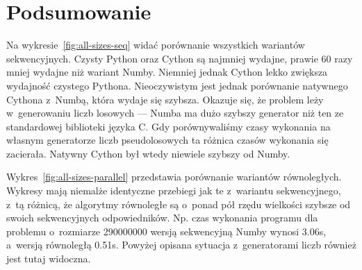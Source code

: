 \begin{figure*}
    \centering
    
    \caption{Czas wykonania algorytmu w zależności od rozmiaru problemu}
    \label{fig:all-sizes-seq}
\end{figure*}


\begin{figure*}
    \centering
    
    \caption{Czas wykonania algorytmu w zależności od rozmiaru problemu}
    \label{fig:all-sizes-parallel}
\end{figure*}

\begin{figure*}
    \centering
    \begin{minipage}[b]{.45\textwidth}
        \centering
        
        \caption{Czas wykonania algorytmu w zależności od liczby wątków}
        \label{fig:all-threads}
    \end{minipage}
    \hfill
    \begin{minipage}[b]{.45\textwidth}
        \centering
        
        \caption{Przyspieszenie liczenia liczby $\pi$}
        \label{fig:all-speedup}
    \end{minipage}
\end{figure*}


\section{Podsumowanie}

Na wykresie~\ref{fig:all-sizes-seq} widać porównanie
wszystkich wariantów sekwencyjnych.
Czysty Python oraz Cython są najmniej wydajne,
prawie 60 razy mniej wydajne niż wariant Numby.
Niemniej jednak Cython lekko zwiększa wydajność czystego Pythona.
Nieoczywistym jest jednak porównanie natywnego Cythona z~Numbą,
która wydaje się szybsza.
Okazuje się, że problem leży w~generowaniu liczb losowych ---
Numba ma dużo szybszy generator niż ten ze standardowej biblioteki
języka C\@.
Gdy porównywaliśmy czasy wykonania na własnym generatorze liczb pseudolosowych
ta różnica czasów wykonania się zacierała.
Natywny Cython był wtedy niewiele szybszy od Numby.

Wykres~\ref{fig:all-sizes-parallel} przedstawia porównanie wariantów równoległych.
Wykresy mają niemalże identyczne przebiegi jak te z~wariantu sekwencyjnego,
z~tą różnicą, że algorytmy równoległe są o~ponad pół rzędu wielkości szybsze
od swoich sekwencyjnych odpowiedników.
Np. czas wykonania programu
dla problemu o~rozmiarze 290000000 wersją sekwencyjną Numby wynosi 3.06s,
a~wersją równoległą 0.51s.
Powyżej opisana sytuacja z~generatorami liczb również jest tutaj widoczna.

